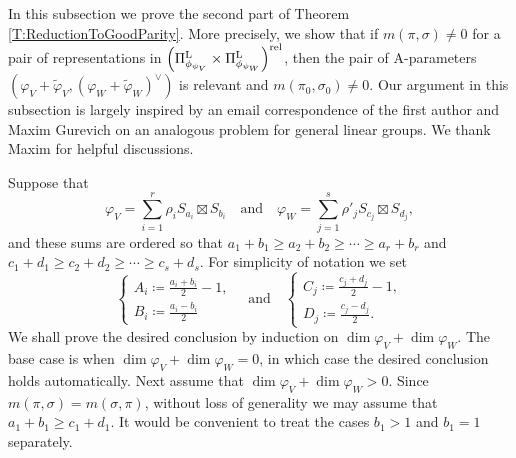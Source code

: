 \documentclass[11pt,letterpaper]{amsart}
\theoremstyle{plain}
\numberwithin{theorem}{section}
\numberwithin{equation}{subsection}
\theoremstyle{remark}
\def\LP{\Pi^{\rm L}} %
\def\rel{{\rm rel}} %
\begin{document}
In this subsection we prove the second part of Theorem \ref{T:ReductionToGoodParity}. More precisely, we show that if $m\left(\pi, \sigma\right)\neq 0$ for a pair of representations in $\left(\LP_{\phi_{\psi_{V}}}\times\LP_{\phi_{\psi_{W}}}\right)^\rel$, then the pair of A-parameters $\left(\varphi_V + \widetilde{\varphi}_V,\left(\varphi_W + \widetilde{\varphi}_W\right)^\vee\right)$ is relevant and $m\left(\pi_0,\sigma_0\right)\neq0$. Our argument in this subsection is largely inspired by an email correspondence of the first author and Maxim Gurevich on an analogous problem for general linear groups. We thank Maxim for helpful discussions.

\vskip 5pt

Suppose that
\[
    \varphi_V = \sum_{i=1}^r \rho_i S_{a_i}\boxtimes S_{b_i} \quad \text{and} \quad \varphi_W = \sum_{j=1}^s \rho'_j S_{c_j}\boxtimes S_{d_j},
\]
and these sums are ordered so that $a_1+b_1\geq a_2+b_2\geq \cdots\geq a_r+b_r$ and $c_1+d_1\geq c_2+d_2\geq \cdots\geq c_s+d_s$. For simplicity of notation we set 
\[
    \begin{cases}
       A_i \coloneqq \frac{a_i+b_i}{2}-1,\\
       B_i \coloneqq \frac{a_i-b_i}{2} 
    \end{cases}
    \quad\text{and}\quad
    \begin{cases}
      C_j \coloneqq \frac{c_j+d_j}{2}-1,\\
      D_j \coloneqq \frac{c_j-d_j}{2}.  
    \end{cases}
\]
We shall prove the desired conclusion by induction on $\dim \varphi_V + \dim \varphi_W$. The base case is when $\dim \varphi_V + \dim \varphi_W=0$, in which case the desired conclusion holds automatically.
Next assume that $\dim \varphi_V + \dim \varphi_W>0$. Since $m\left(\pi,\sigma\right)=m\left(\sigma,\pi\right)$, without loss of generality we may assume that $a_1+b_1\geq c_1+d_1$. It would be convenient to treat the cases $b_1>1$ and $b_1=1$ separately. 

\vskip 5pt
\end{document}
